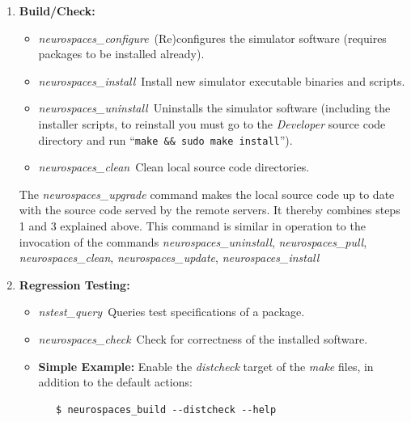 \documentclass[12pt]{article}
\begin{document}
\begin{enumerate}
   \item{\bf Build/Check:}
   \begin{itemize}
      \item {\it neurospaces\_configure}\,\,\,(Re)configures the simulator software (requires packages to be installed already).
      \item {\it neurospaces\_install}\,\,\,Install new simulator executable binaries and scripts.
      \item {\it neurospaces\_uninstall}\,\,\,Uninstalls the simulator software (including the installer scripts, to reinstall you must go to the {\it Developer} source code directory and run ``{\tt make \&\& sudo make install}'').
      \item {\it neurospaces\_clean}\,\,\,Clean local source code directories. 
   \end{itemize}
  
   The {\it neurospaces\_upgrade} command makes the local source code
   up to date with the source code served by the remote servers.  It
   thereby combines steps 1 and 3 explained above.  This command is
   similar in operation to the invocation of the commands {\it
     neurospaces\_uninstall}, {\it neurospaces\_pull}, {\it
     neurospaces\_clean}, {\it neurospaces\_update}, {\it
     neurospaces\_install}

   \item {\bf Regression Testing:}
   \begin{itemize}
      \item {\it nstest\_query}\,\,\,Queries test specifications of a package.
      \item {\it neurospaces\_check}\,\,\,Check for correctness of the installed software.
      \item{\bf Simple Example:} Enable the {\it distcheck} target of the {\it make} files, in addition to the default actions:
      \begin{verbatim}
   $ neurospaces_build --distcheck --help
      \end{verbatim}
   \end{itemize}
 

\end{enumerate}
\end{document}
